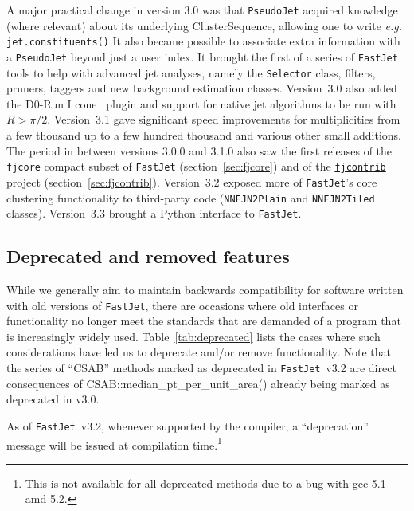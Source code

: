 \documentclass[12pt,a4]{article}
\newcommand{\fastjet}{\texttt{FastJet}\xspace}
\newcommand{\fjcontrib}{\texttt{\href{http://fastjet.hepforge.org/contrib/}{fjcontrib}}\xspace}
\newcommand{\fjcore}{\texttt{fjcore}\xspace}
\newcommand{\ttt}[1]{{\small\texttt{#1}}}
\begin{document}
A major practical change in version 3.0 was that \ttt{PseudoJet}
acquired knowledge 
(where relevant) about its underlying ClusterSequence, allowing one to
write {\em e.g.}  \ttt{jet.constituents()}
%
It also became possible to associate extra information with a
\ttt{PseudoJet} beyond just a user index.
%
It brought the first of a series of \fastjet tools to help with
advanced jet analyses, namely the \ttt{Selector} class, filters,
  pruners, taggers and new background estimation classes.
%
Version~3.0 also added the D0-Run I cone~\cite{Abbott:1997fc} plugin and
support for native jet algorithms to be run with $R>\pi/2$.
%
Version~3.1 gave significant speed improvements for multiplicities
from a few thousand up to a few hundred thousand and various other
small additions.
%
The period in between versions 3.0.0 and 3.1.0 also saw the first
releases of the \fjcore compact subset of \fastjet
(section~\ref{sec:fjcore}) and of the \fjcontrib project
(section~\ref{sec:fjcontrib}).
%
Version~3.2 exposed more of \fastjet's core clustering functionality
to third-party code (\ttt{NNFJN2Plain} and \ttt{NNFJN2Tiled} classes).
%
Version~3.3 brought a Python interface to \fastjet.
 
\subsection{Deprecated and removed features}
\label{sec:deprecated}

While we generally aim to maintain backwards compatibility for
software written with old versions of \fastjet, there are occasions
where old interfaces or functionality no longer meet the standards that
are demanded of a program that is increasingly widely used.
%
Table~\ref{tab:deprecated} lists the cases where such considerations
have led us to deprecate and/or remove functionality.
%
Note that the series of ``CSAB'' methods marked as deprecated in
\fastjet~v3.2 are direct consequences of
CSAB::median\_pt\_per\_unit\_area() already being marked as deprecated in
v3.0.

As of \fastjet~v3.2, whenever supported by the compiler, a
``deprecation'' message will be issued at compilation
time.\footnote{This is not available for all deprecated methods due
  to a bug with gcc 5.1 amd 5.2.}
\end{document}
